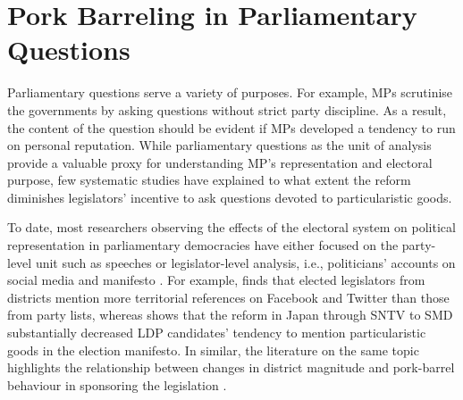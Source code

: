 





 
\section*{\centering Pork Barreling in Parliamentary Questions}

Parliamentary questions serve a variety of purposes. For example, MPs scrutinise the governments by asking questions without strict party discipline. As a result, the content of the question should be evident if MPs developed a tendency to run on personal reputation. While parliamentary questions as the unit of analysis provide a valuable proxy for understanding MP's representation and electoral purpose, few systematic studies have explained to what extent the reform diminishes legislators' incentive to ask questions devoted to particularistic goods.

To date, most researchers observing the effects of the electoral system on political representation in parliamentary democracies have either focused on the party-level unit such as speeches \citep[e.g.,][]{Hoyland2019, Guinaudeau2021, Ishima2020} or legislator-level analysis, i.e., politicians' accounts on social media and manifesto \citep[e.g.,][]{Catalinac2017, Schurmann2022}. For example, \citet{Schurmann2022} finds that elected legislators from districts mention more territorial references on Facebook and Twitter than those from party lists, whereas \citet{Catalinac2017} shows that the reform in Japan through SNTV to SMD substantially decreased LDP candidates' tendency to mention particularistic goods in the election manifesto. In similar, the literature on the same topic highlights the relationship between changes in district magnitude and pork-barrel behaviour in sponsoring the legislation \citep{Luor2008, Luor2009, Sheng2014, Sheng2014a}. 

